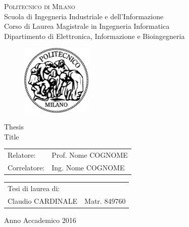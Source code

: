 \begin{titlepage}

\begin{center}
\Large{\textsc{Politecnico di Milano}}\\
\Large{Scuola di Ingegneria Industriale e dell'Informazione}\\
\large{Corso di Laurea Magistrale in Ingegneria Informatica}\\
\large{Dipartimento di Elettronica, Informazione e Bioingegneria}
\par\end{center}

\vspace{0.5cm}


\begin{center}
\begin{figure}[h]
\centering{}\includegraphics[width=0.3\textwidth]{title-page/logo-polimi}
\end{figure}
\vspace{1cm}

\par\end{center}

\begin{center}
\LARGE{Thesis\\
Title}\vspace{2cm}

\par\end{center}

\begin{flushleft}
\begin{tabular}{ll}
Relatore:  & Prof. Nome COGNOME\tabularnewline
Correlatore:  & Ing. Nome COGNOME\tabularnewline
\end{tabular}\vspace{1cm}

\par\end{flushleft}

\begin{flushright}
\begin{tabular}{ll}
Tesi di laurea di: & \tabularnewline
Claudio CARDINALE & Matr. 849760\tabularnewline
\end{tabular}\vspace{4cm}

\par\end{flushright}

\begin{center}
{\large{}Anno Accademico 2016}
\par\end{center}{\large \par}

\end{titlepage}
